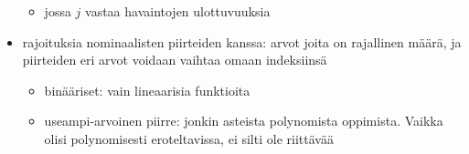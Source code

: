 \begin{itemize}
    \begin{itemize}
        \item jossa $j$ vastaa havaintojen ulottuvuuksia
    \end{itemize}
    \item rajoituksia nominaalisten piirteiden kanssa: arvot joita on rajallinen määrä, ja piirteiden eri arvot voidaan vaihtaa omaan indeksiinsä
    \begin{itemize}
        \item binääriset: vain lineaarisia funktioita
        \item useampi-arvoinen piirre: jonkin asteista polynomista oppimista. Vaikka olisi polynomisesti eroteltavissa, ei silti ole riittävää
    \end{itemize}
\end{itemize}

